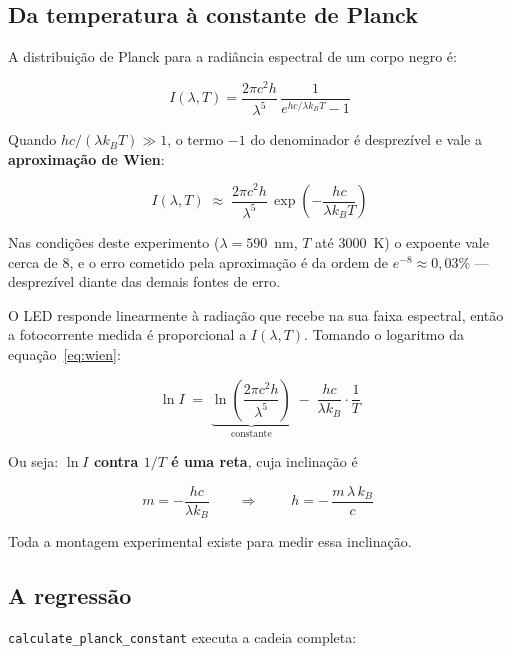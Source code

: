 \documentclass[11pt,a4paper]{article}
\begin{document}
\subsection{Da temperatura à constante de Planck}

A distribuição de Planck para a radiância espectral de um corpo negro é:

\begin{equation}
I(\lambda,T) = \frac{2\pi c^2 h}{\lambda^5}\,
\frac{1}{e^{hc/\lambda k_B T} - 1}
\end{equation}

Quando $hc/(\lambda k_B T) \gg 1$, o termo $-1$ do denominador é desprezível e
vale a \textbf{aproximação de Wien}:

\begin{equation}
I(\lambda,T) \;\approx\; \frac{2\pi c^2 h}{\lambda^5}\,
\exp\!\left(-\frac{hc}{\lambda k_B T}\right)
\label{eq:wien}
\end{equation}

Nas condições deste experimento ($\lambda = 590$~nm, $T$ até 3000~K) o expoente
vale cerca de 8, e o erro cometido pela aproximação é da ordem de
$e^{-8} \approx 0{,}03\%$ --- desprezível diante das demais fontes de erro.

O LED responde linearmente à radiação que recebe na sua faixa espectral, então
a fotocorrente medida é proporcional a $I(\lambda,T)$. Tomando o logaritmo da
equação~\eqref{eq:wien}:

\begin{equation}
\ln I \;=\; \underbrace{\ln\!\left(\frac{2\pi c^2 h}{\lambda^5}\right)}_{\text{constante}}
\;-\; \frac{hc}{\lambda k_B}\cdot\frac{1}{T}
\end{equation}

Ou seja: \textbf{$\ln I$ contra $1/T$ é uma reta}, cuja inclinação é

\begin{equation}
m = -\frac{hc}{\lambda k_B}
\qquad\Longrightarrow\qquad
\boxed{\;h = -\,\frac{m\,\lambda\,k_B}{c}\;}
\label{eq:h}
\end{equation}

Toda a montagem experimental existe para medir essa inclinação.

\subsection{A regressão}

\texttt{calculate\_planck\_constant} executa a cadeia completa:
\end{document}
